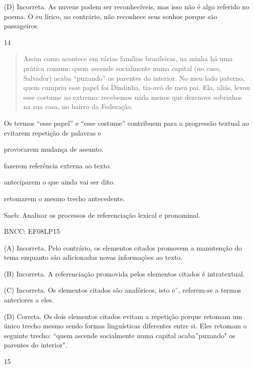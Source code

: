 (D) Incorreta. As nuvens podem ser reconhecíveis, mas isso não é algo
referido no poema. O eu lírico, ao contrário, não reconhece seus sonhos
porque são passageiros.

\num{14}

\begin{quote}
Assim como acontece em várias famílias brasileiras, na minha há uma
prática comum: quem ascende socialmente numa capital (no caso, Salvador)
acaba ``puxando'' os parentes do interior. No meu lado paterno, quem
cumpriu esse papel foi Dindinha, tia-avó de meu pai. Ela, aliás, levou
esse costume ao extremo: recebemos nada menos que dezenove sobrinhos na
sua casa, no bairro da Federação.
\end{quote}


Os termos ``esse papel'' e ``esse costume'' contribuem para a progressão
textual ao evitarem repetição de palavras e

\begin{escolha}
\item provocarem mudança de assunto.

\item fazerem referência externa ao texto.

\item anteciparem o que ainda vai ser dito.

\item retomarem o mesmo trecho antecedente.
\end{escolha}

Saeb: Analisar os processos de referenciação lexical e pronominal.

BNCC: EF08LP15

(A) Incorreta. Pelo contrário, os elementos citados promovem a
manutenção do tema enquanto são adicionadas novas informações ao texto.

(B) Incorreta. A referenciação promovida pelos elementos citados é
intratextual.

(C) Incorreta. Os elementos citados são anafóricos, isto e´, referem-se
a termos anteriores a eles.

(D) Correta. Os dois elementos citados evitam a repetição porque retomam
um único trecho mesmo sendo formas linguísticas diferentes entre si.
Eles retomam o seguinte trecho: ``quem ascende socialmente numa capital
acaba''puxando" os parentes do interior".

\num{15}

